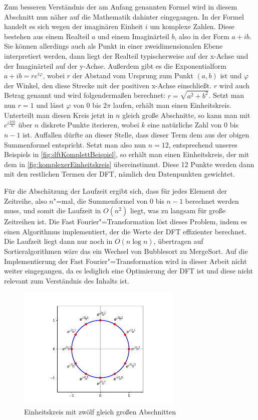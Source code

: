 Zum besseren Verständnis der am Anfang genannten Formel wird in diesem Abschnitt nun näher auf die Mathematik dahinter eingegangen. In der Formel handelt es sich wegen der imaginären Einheit $i$ um komplexe Zahlen. Diese bestehen aus einem Realteil $a$ und einem Imaginärteil $b$, also in der Form $a + ib$. Sie können allerdings auch als Punkt in einer zweidimensionalen Ebene interpretiert werden, dann liegt der Realteil typischerweise auf der x-Achse und der Imaginärteil auf der y-Achse. Außerdem gibt es die Exponentialform $a+ib=re^{i\varphi}$, wobei $r$ der Abstand vom Ursprung zum Punkt $(a,b)$ ist und $\varphi$ der Winkel, den diese Strecke mit der positiven x-Achse einschließt. $r$ wird auch Betrag genannt und wird folgendermaßen berechnet: $r=\sqrt{a^2+b^2}$. Setzt man nun $r=1$ und lässt $\varphi$ von 0 bis $2\pi$ laufen, erhält man einen Einheitskreis. Unterteilt man diesen Kreis jetzt in $n$ gleich große Abschnitte, so kann man mit $e^{i\frac{2\pi k}{n}}$ über $n$ diskrete Punkte iterieren, wobei $k$ eine natürliche Zahl von 0 bis $n-1$ ist. Auffallen dürfte an dieser Stelle, dass dieser Term dem aus der obigen Summenformel entspricht. Setzt man also nun $n=12$, entsprechend unseres Beispiels in \autoref{fig:dftKomplettBeispiel}, so erhält man einen Einheitskreis, der mit dem in \autoref{fig:komplexerEinheitskreis} übereinstimmt. Diese 12 Punkte werden dann mit den restlichen Termen der \acs{DFT}, nämlich den Datenpunkten gewichtet.

Für die Abschätzung der Laufzeit ergibt sich, dass für jedes Element der Zeitreihe, also $n$"=mal, die Summenformel von 0 bis $n-1$ berechnet werden muss, und somit die Laufzeit in $O(n^2)$ liegt, was zu langsam für große Zeitreihen ist. Die Fast Fourier"=Transformation löst dieses Problem, indem es einen Algorithmus implementiert, der die Werte der \acs{DFT} effizienter berechnet. Die Laufzeit liegt dann nur noch in $O(n\log n)$, übertragen auf Sortieralgorithmen wäre das ein Wechsel von Bubblesort zu MergeSort. Auf die Implementierung der Fast Fourier"=Transformation wird in dieser Arbeit nicht weiter eingegangen, da es lediglich eine Optimierung der \acs{DFT} ist und diese nicht relevant zum Verständnis des Inhalts ist.
\begin{figure}[bth] 
  \centering
  \includegraphics[width=0.7\textwidth]{Graphics/KomplexerEinheitskreis.pdf}
  \caption{Einheitskreis mit zwölf gleich großen Abschnitten}
  \label{fig:komplexerEinheitskreis}
\end{figure}

